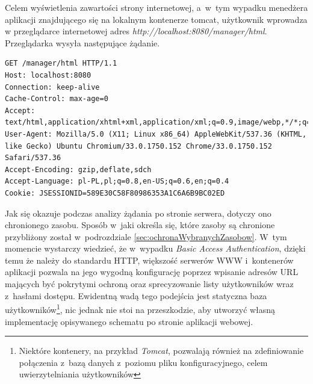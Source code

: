\documentclass[11pt]{aghdpl}
\begin{document}

Celem wyświetlenia zawartości strony internetowej, a~w~tym wypadku menedżera aplikacji znajdującego się na lokalnym kontenerze tomcat, użytkownik wprowadza w przeglądarce internetowej adres \emph{http://localhost:8080/manager/html}. Przeglądarka wysyła następujące żądanie.
\begin{lstlisting}
GET /manager/html HTTP/1.1
Host: localhost:8080
Connection: keep-alive
Cache-Control: max-age=0
Accept: text/html,application/xhtml+xml,application/xml;q=0.9,image/webp,*/*;q=0.8
User-Agent: Mozilla/5.0 (X11; Linux x86_64) AppleWebKit/537.36 (KHTML, like Gecko) Ubuntu Chromium/33.0.1750.152 Chrome/33.0.1750.152 Safari/537.36
Accept-Encoding: gzip,deflate,sdch
Accept-Language: pl-PL,pl;q=0.8,en-US;q=0.6,en;q=0.4
Cookie: JSESSIONID=589E30C58F80986353A1C6A6B9BC02ED
\end{lstlisting}

Jak się okazuje podczas analizy żądania po stronie serwera, dotyczy ono chronionego zasobu. Sposób w~jaki określa się, które zasoby są chronione przybliżony został w~podrozdziale \ref{sec:ochronaWybranychZasobow}. W~tym momencie wystarczy wiedzieć, że w~wypadku \emph{Basic Access Authentication}, dzięki temu że należy do standardu HTTP, większość serwerów WWW i~kontenerów aplikacji pozwala na jego wygodną konfigurację poprzez wpisanie adresów URL mających być pokrytymi ochroną oraz sprecyzowanie listy użytkowników wraz z~hasłami dostępu. Ewidentną wadą tego podejścia jest statyczna baza użytkowników\footnote{Niektóre kontenery, na przykład \emph{Tomcat}, pozwalają również na zdefiniowanie połączenia z~bazą danych z~poziomu pliku konfiguracyjnego, celem uwierzytelniania użytkowników}, nic jednak nie stoi na przeszkodzie, aby utworzyć własną implementację opisywanego schematu po stronie aplikacji webowej.
\end{document}
